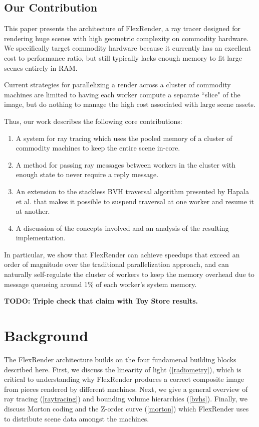 \documentclass[12pt]{ucthesis}
\begin{document}
\section{Our Contribution}
\label{contribution}

This paper presents the architecture of FlexRender, a ray tracer designed for
rendering huge scenes with high geometric complexity on commodity hardware. We
specifically target commodity hardware because it currently has an excellent
cost to performance ratio, but still typically lacks enough memory to fit large
scenes entirely in RAM.

Current strategies for parallelizing a render across a cluster of commodity
machines are limited to having each worker compute a separate ``slice" of the
image, but do nothing to manage the high cost associated with large scene
assets.

Thus, our work describes the following core contributions:

\begin{enumerate}
    \item A system for ray tracing which uses the pooled memory of a cluster of
        commodity machines to keep the entire scene in-core.
    \item A method for passing ray messages between workers in the cluster with
        enough state to never require a reply message.
    \item An extension to the stackless BVH traversal algorithm presented by
        Hapala et al. \cite{hapala:2011} that makes it possible to suspend
        traversal at one worker and resume it at another.
    \item A discussion of the concepts involved and an analysis of the resulting
        implementation.
\end{enumerate}

In particular, we show that FlexRender can achieve speedups that exceed an
order of magnitude over the traditional parallelization approach, and can
naturally self-regulate the cluster of workers to keep the memory overhead due
to message queueing around 1\% of each worker's system memory.

\textbf{TODO: Triple check that claim with Toy Store results.}

\chapter{Background}
\label{background}

The FlexRender architecture builds on the four fundamenal building blocks
described here. First, we discuss the linearity of light (\ref{radiometry}),
which is critical to understanding why FlexRender produces a correct composite
image from pieces rendered by different machines. Next, we give a general
overview of ray tracing (\ref{raytracing}) and bounding volume hierarchies
(\ref{bvhs}). Finally, we discuss Morton coding and the Z-order curve
(\ref{morton}) which FlexRender uses to distribute scene data amongst the
machines.
\end{document}
